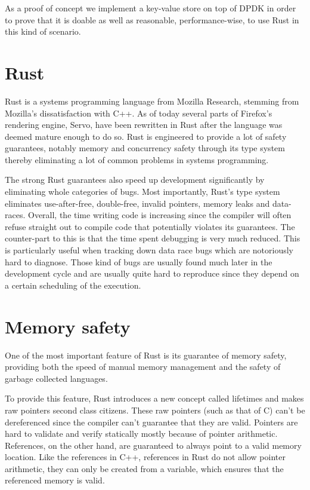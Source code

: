 \documentclass[11pt]{book}
\begin{document}
As a proof of concept we implement a key-value store on top of
DPDK in order to prove that it is doable as well as reasonable,
performance-wise, to use Rust in this kind of scenario.

\section{Rust}

Rust is a systems programming language from Mozilla Research, stemming
from Mozilla's dissatisfaction with C++. As of today several parts of
Firefox's rendering engine, Servo, have been rewritten in Rust after
the language was deemed mature enough to do so. Rust is engineered to
provide a lot of safety guarantees, notably memory and concurrency
safety through its type system thereby eliminating a lot of common
problems in systems programming.

The strong Rust guarantees also speed up development significantly by
eliminating whole categories of bugs. Most importantly, Rust's type system
eliminates use-after-free, double-free, invalid pointers, memory leaks
and data-races. Overall, the time writing code is increasing since the
compiler will often refuse straight out to compile code that
potentially violates its guarantees. The counter-part to this is that
the time spent debugging is very much reduced. This is particularly
useful when tracking down data race bugs which are notoriously hard to
diagnose. Those kind of bugs are usually found much later in the
development cycle and are usually quite hard to reproduce since they
depend on a certain scheduling of the execution.

\section{Memory safety}

One of the most important feature of Rust is its guarantee of memory
safety, providing both the speed of manual memory management and the
safety of garbage collected languages.

To provide this feature, Rust introduces a new concept called
lifetimes and makes raw pointers second class citizens. These raw
pointers (such as that of C) can't be dereferenced since the compiler
can't guarantee that they are valid. Pointers are hard to validate and
verify statically mostly because of pointer arithmetic. References, on
the other hand, are guaranteed to always point to a valid memory
location. Like the references in C++, references in Rust do not allow
pointer arithmetic, they can only be created from a variable, which
ensures that the referenced memory is valid.
\end{document}
